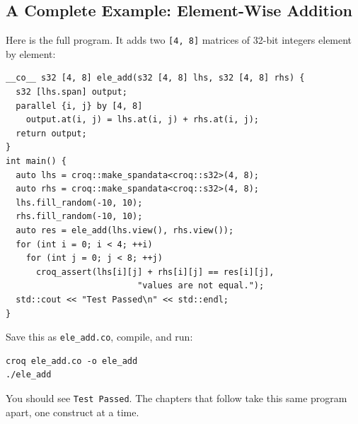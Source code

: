 \subsection*{A Complete Example: Element-Wise Addition}

Here is the full program. It adds two \texttt{[4, 8]} matrices of 32-bit integers element by element:

\begin{lstlisting}[language=croqtile,caption={A complete element-wise addition}]
__co__ s32 [4, 8] ele_add(s32 [4, 8] lhs, s32 [4, 8] rhs) {
  s32 [lhs.span] output;
  parallel {i, j} by [4, 8]
    output.at(i, j) = lhs.at(i, j) + rhs.at(i, j);
  return output;
}
int main() {
  auto lhs = croq::make_spandata<croq::s32>(4, 8);
  auto rhs = croq::make_spandata<croq::s32>(4, 8);
  lhs.fill_random(-10, 10);
  rhs.fill_random(-10, 10);
  auto res = ele_add(lhs.view(), rhs.view());
  for (int i = 0; i < 4; ++i)
    for (int j = 0; j < 8; ++j)
      croq_assert(lhs[i][j] + rhs[i][j] == res[i][j],
                          "values are not equal.");
  std::cout << "Test Passed\n" << std::endl;
}
\end{lstlisting}

Save this as \texttt{ele\_add.co}, compile, and run:

\begin{lstlisting}[language={},caption={Compile and run the example}]
croq ele_add.co -o ele_add
./ele_add
\end{lstlisting}

You should see \texttt{Test Passed}. The chapters that follow take this same program apart, one construct at a time.
